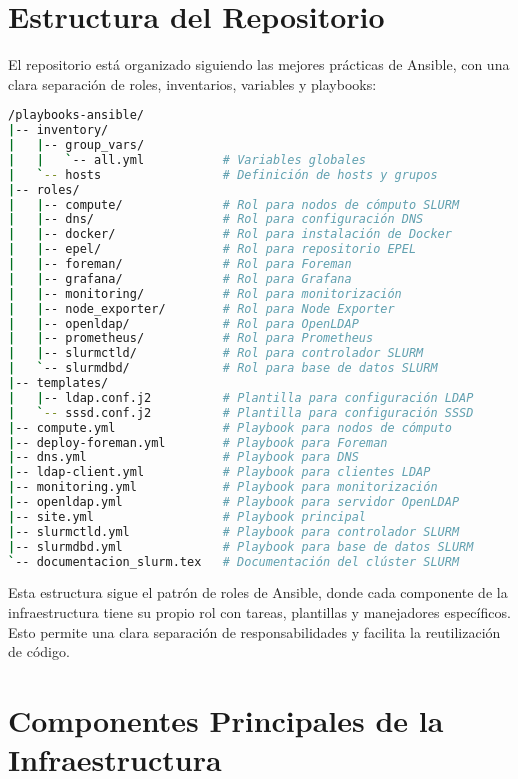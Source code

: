 \documentclass[12pt,a4paper]{article}
\begin{document}
\section{Estructura del Repositorio}
\newpage

El repositorio está organizado siguiendo las mejores prácticas de Ansible, con una clara separación de roles, inventarios, variables y playbooks:

\begin{lstlisting}[language=bash, caption=Estructura del repositorio]
/playbooks-ansible/
|-- inventory/
|   |-- group_vars/
|   |   `-- all.yml           # Variables globales
|   `-- hosts                 # Definición de hosts y grupos
|-- roles/
|   |-- compute/              # Rol para nodos de cómputo SLURM
|   |-- dns/                  # Rol para configuración DNS
|   |-- docker/               # Rol para instalación de Docker
|   |-- epel/                 # Rol para repositorio EPEL
|   |-- foreman/              # Rol para Foreman
|   |-- grafana/              # Rol para Grafana
|   |-- monitoring/           # Rol para monitorización
|   |-- node_exporter/        # Rol para Node Exporter
|   |-- openldap/             # Rol para OpenLDAP
|   |-- prometheus/           # Rol para Prometheus
|   |-- slurmctld/            # Rol para controlador SLURM
|   `-- slurmdbd/             # Rol para base de datos SLURM
|-- templates/
|   |-- ldap.conf.j2          # Plantilla para configuración LDAP
|   `-- sssd.conf.j2          # Plantilla para configuración SSSD
|-- compute.yml               # Playbook para nodos de cómputo
|-- deploy-foreman.yml        # Playbook para Foreman
|-- dns.yml                   # Playbook para DNS
|-- ldap-client.yml           # Playbook para clientes LDAP
|-- monitoring.yml            # Playbook para monitorización
|-- openldap.yml              # Playbook para servidor OpenLDAP
|-- site.yml                  # Playbook principal
|-- slurmctld.yml             # Playbook para controlador SLURM
|-- slurmdbd.yml              # Playbook para base de datos SLURM
`-- documentacion_slurm.tex   # Documentación del clúster SLURM
\end{lstlisting}

Esta estructura sigue el patrón de roles de Ansible, donde cada componente de la infraestructura tiene su propio rol con tareas, plantillas y manejadores específicos. Esto permite una clara separación de responsabilidades y facilita la reutilización de código.

\section{Componentes Principales de la Infraestructura}
\newpage
\end{document}
